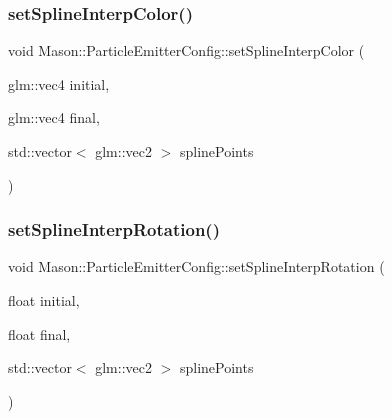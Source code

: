 \hypertarget{struct_mason_1_1_particle_emitter_config_aaf515319a62060a75edbb1e7b6403ff2}{}\label{struct_mason_1_1_particle_emitter_config_aaf515319a62060a75edbb1e7b6403ff2} 
\subsubsection{\texorpdfstring{set\+Spline\+Interp\+Color()}{setSplineInterpColor()}}
{\footnotesize\ttfamily void Mason\+::\+Particle\+Emitter\+Config\+::set\+Spline\+Interp\+Color (\begin{DoxyParamCaption}\item[{glm\+::vec4}]{initial,  }\item[{glm\+::vec4}]{final,  }\item[{std\+::vector$<$ glm\+::vec2 $>$}]{spline\+Points }\end{DoxyParamCaption})\hspace{0.3cm}{\ttfamily [inline]}}

\hypertarget{struct_mason_1_1_particle_emitter_config_abcaf3368ccf9b524538a3cf3fadb15d2}{}\label{struct_mason_1_1_particle_emitter_config_abcaf3368ccf9b524538a3cf3fadb15d2} 
\subsubsection{\texorpdfstring{set\+Spline\+Interp\+Rotation()}{setSplineInterpRotation()}}
{\footnotesize\ttfamily void Mason\+::\+Particle\+Emitter\+Config\+::set\+Spline\+Interp\+Rotation (\begin{DoxyParamCaption}\item[{float}]{initial,  }\item[{float}]{final,  }\item[{std\+::vector$<$ glm\+::vec2 $>$}]{spline\+Points }\end{DoxyParamCaption})\hspace{0.3cm}{\ttfamily [inline]}}

\hypertarget{struct_mason_1_1_particle_emitter_config_a4288325ce9dcf3437fbcabaf99f968b4}{}\label{struct_mason_1_1_particle_emitter_config_a4288325ce9dcf3437fbcabaf99f968b4} 
